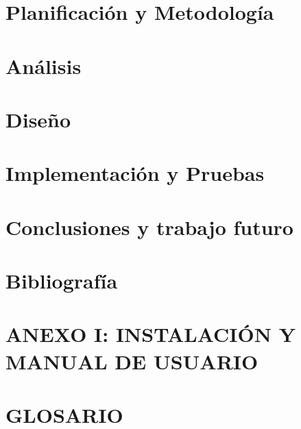 \documentclass[b5paper,10pt,twoside]{book}
\begin{document}
	
	
	\chapter{Planificación y Metodología}
	
	
	
	\chapter{Análisis}
	
	
	
	\chapter{Diseño}
	
	
	
	\chapter{Implementación y Pruebas}
	
	
	
	\chapter{Conclusiones y trabajo futuro}
	
	
	
	\chapter{Bibliografía}
	
	
	
	\chapter*{ANEXO I: INSTALACIÓN Y MANUAL DE USUARIO }
		
	
	
	\chapter*{GLOSARIO}
	
	
\end{document}
